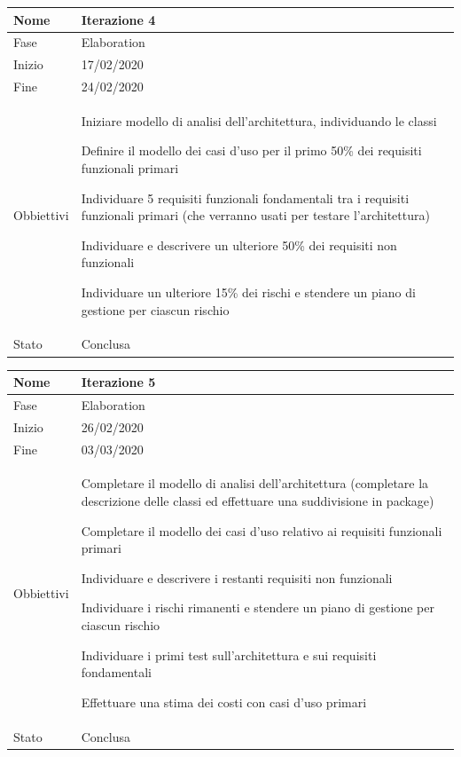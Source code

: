 \begin{center}
\begin{tabular}{ |p{2cm}|p{10cm}|  }
\hline
Nome & Iterazione 4 \\\hline
Fase & Elaboration \\\hline
Inizio & 17/02/2020 \\\hline
Fine &  24/02/2020 \\\hline
Obbiettivi & 
	\begin{compactitem}
		\item Iniziare modello di analisi dell'architettura, individuando le classi
		\item Definire il modello dei casi d'uso per il primo 50\% dei requisiti funzionali primari
		\item Individuare 5 requisiti funzionali fondamentali tra i requisiti funzionali primari (che verranno usati per testare l'architettura)
		\item Individuare e descrivere un ulteriore 50\% dei requisiti non funzionali
		\item Individuare un ulteriore 15\% dei rischi e stendere un piano di gestione per ciascun rischio
	\end{compactitem}\\\hline
Stato &  Conclusa \\\hline
\end{tabular}
\label{table:4}\newline

\begin{tabular}{ |p{2cm}|p{10cm}|  }
\hline
Nome & Iterazione 5 \\\hline
Fase & Elaboration \\\hline
Inizio & 26/02/2020 \\\hline
Fine &  03/03/2020  \\\hline
Obbiettivi & 
	\begin{compactitem}
		\item Completare il modello di analisi dell'architettura (completare la descrizione delle classi ed effettuare una suddivisione in package)
		\item Completare il modello dei casi d'uso relativo ai requisiti funzionali primari
		\item Individuare e descrivere i restanti requisiti non funzionali %
		\item Individuare i rischi rimanenti e stendere un piano di gestione per ciascun rischio %
		\item Individuare i primi test sull'architettura e sui requisiti fondamentali
		\item Effettuare una stima dei costi con casi d'uso primari
	\end{compactitem}\\\hline
Stato &  Conclusa \\\hline
\end{tabular}
\label{table:5}\newline


\end{center}
